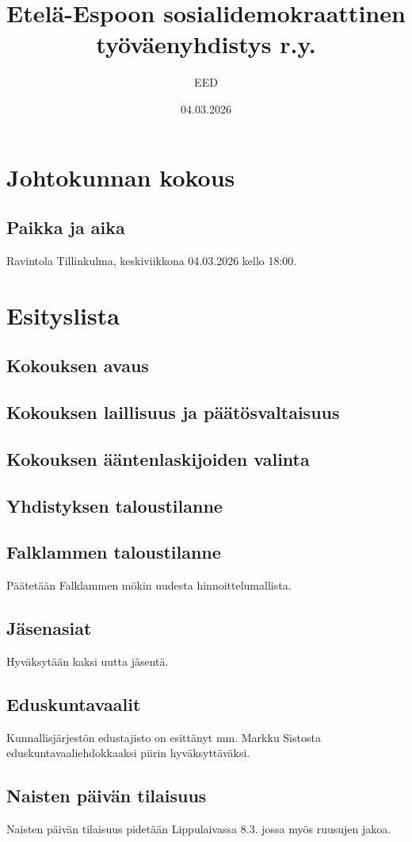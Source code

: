 \documentclass[a4paper,12pt]{article}
\title{Etelä-Espoon sosialidemokraattinen työväenyhdistys r.y.}
\author{EED}
\date{04.03.2026}
\begin{document}
\maketitle
\tableofcontents
\section*{Johtokunnan kokous}
\subsection*{Paikka ja aika}
Ravintola Tillinkulma, keskiviikkona 04.03.2026 kello 18:00.
\section*{Esityslista}
\subsection{Kokouksen avaus}
\subsection{Kokouksen laillisuus ja päätösvaltaisuus}
\subsection{Kokouksen ääntenlaskijoiden valinta}
\subsection{Yhdistyksen taloustilanne}
\subsection{Falklammen taloustilanne}
Päätetään Falklammen mökin uudesta hinnoittelumallista.
\subsection{Jäsenasiat}
Hyväksytään kaksi uutta jäsentä.
\subsection{Eduskuntavaalit}
Kunnallisjärjestön edustajisto on esittänyt mm. Markku Sistosta eduskuntavaaliehdokkaaksi piirin hyväksyttäväksi.
\subsection{Naisten päivän tilaisuus}
Naisten päivän tilaisuus pidetään Lippulaivassa 8.3. jossa myös ruusujen jakoa.
\end{document}

